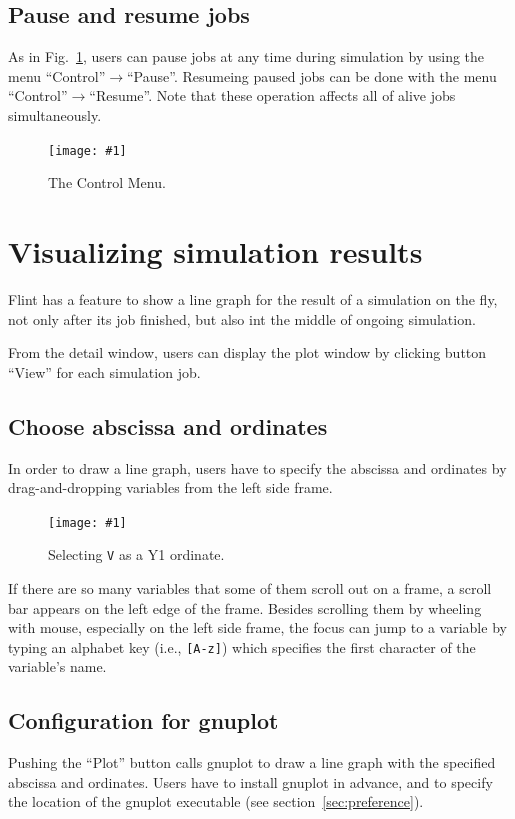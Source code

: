 \documentclass[a4paper,10pt]{report}
\newcommand\FigureOfImage[2]{\begin{figure}[h]
  \centering
  \texttt{[image: \#1]}
  \caption{#2}\label{fig:#1}
\end{figure}}
\begin{document}
\subsection{Pause and resume jobs}
As in Fig.~\ref{fig:control}, users can pause jobs at any time during simulation
by using the menu ``Control''$\rightarrow$``Pause''. Resumeing paused jobs can
be done with the menu ``Control''$\rightarrow$``Resume''.
Note that these operation affects all of alive jobs simultaneously.
\FigureOfImage{control}{The Control Menu.}

\section{Visualizing simulation results}
Flint has a feature to show a line graph for the result of a simulation on the
fly, not only after its job finished, but also int the middle of ongoing
simulation.

From the detail window, users can display the plot window by clicking button
``View'' for each simulation job.

\subsection{Choose abscissa and ordinates}
In order to draw a line graph, users have to specify the abscissa and ordinates
by drag-and-dropping variables from the left side frame.
\FigureOfImage{lr-plot}{Selecting {\tt V} as a Y1 ordinate.}

If there are so many variables that some of them scroll out on a frame, a scroll
bar appears on the left edge of the frame. Besides scrolling them by wheeling
with mouse, especially on the left side frame, the focus can jump to a variable
by typing an alphabet key (i.e., \texttt{[A-z]}) which specifies the first
character of the variable's name.

\subsection{Configuration for gnuplot}
Pushing the ``Plot'' button calls gnuplot to draw a line graph with the
specified abscissa and ordinates. Users have to install gnuplot in advance, and
to specify the location of the gnuplot executable (see
section~\ref{sec:preference}).
\end{document}
